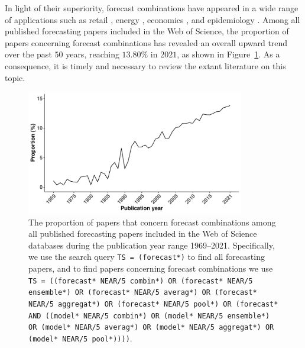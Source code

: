\documentclass[a4paper,11pt]{article}
\begin{document}
In light of their superiority, forecast combinations have appeared in a wide range of applications such as retail \citep{Ma2021-np}, energy \citep{Xie2016-fb}, economics \citep{Aastveit2019-lf}, and epidemiology \citep{Ray2022-co}. Among all published forecasting papers included in the Web of Science, the proportion of papers concerning forecast combinations has revealed an overall upward trend over the past $50$ years, reaching $13.80\%$ in $2021$, as shown in Figure~\ref{fig:prop}. As a consequence, it is timely and necessary to review the extant literature on this topic.

\begin{figure}[!htb]
  \centering \includegraphics[width=0.85\textwidth]{prop}
  \caption{The proportion of papers that concern forecast combinations among all published forecasting papers included in the Web of Science databases during the publication year range 1969--2021. Specifically, we use the search query \texttt{TS = (forecast*)} to find all forecasting papers, and to find papers concerning forecast combinations we use \texttt{TS = ((forecast* NEAR/5 combin*) OR (forecast* NEAR/5 ensemble*) OR (forecast* NEAR/5 averag*) OR (forecast* NEAR/5 aggregat*) OR (forecast* NEAR/5 pool*) OR (forecast* AND ((model* NEAR/5 combin*) OR (model* NEAR/5 ensemble*) OR (model* NEAR/5 averag*) OR (model* NEAR/5 aggregat*) OR (model* NEAR/5 pool*))))}.}
  \label{fig:prop}
\end{figure}
\end{document}
